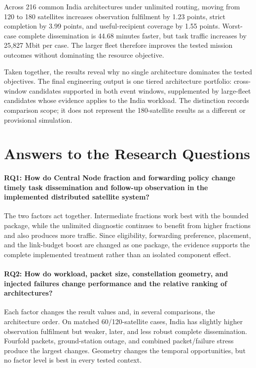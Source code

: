 Across 216 common India architectures under unlimited routing, moving from 120 to 180 satellites increases observation fulfilment by 1.23 points, strict completion by 3.99 points, and useful-recipient coverage by 1.55 points. Worst-case complete dissemination is 44.68 minutes faster, but task traffic increases by 25,827 Mbit per case. The larger fleet therefore improves the tested mission outcomes without dominating the resource objective.

Taken together, the results reveal why no single architecture dominates the tested objectives. The final engineering output is one tiered architecture portfolio: cross-window candidates supported in both event windows, supplemented by large-fleet candidates whose evidence applies to the India workload. The distinction records comparison scope; it does not represent the 180-satellite results as a different or provisional simulation.

\section{Answers to the Research Questions}

\paragraph{RQ1: How do Central Node fraction and forwarding policy change timely task dissemination and follow-up observation in the implemented distributed satellite system?} The two factors act together. Intermediate fractions work best with the bounded package, while the unlimited diagnostic continues to benefit from higher fractions and also produces more traffic. Since eligibility, forwarding preference, placement, and the link-budget boost are changed as one package, the evidence supports the complete implemented treatment rather than an isolated component effect.

\paragraph{RQ2: How do workload, packet size, constellation geometry, and injected failures change performance and the relative ranking of architectures?} Each factor changes the result values and, in several comparisons, the architecture order. On matched 60/120-satellite cases, India has slightly higher observation fulfilment but weaker, later, and less robust complete dissemination. Fourfold packets, ground-station outage, and combined packet/failure stress produce the largest changes. Geometry changes the temporal opportunities, but no factor level is best in every tested context.

